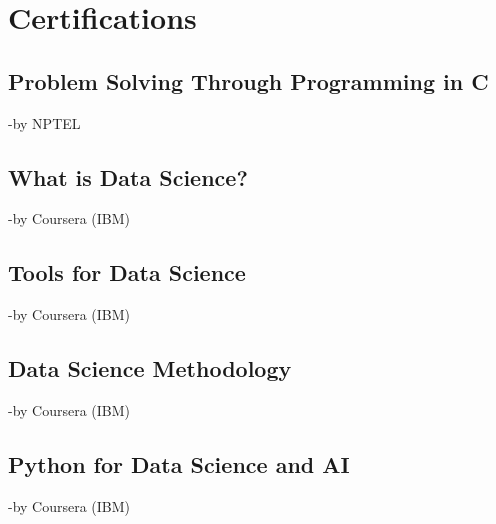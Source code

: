 \documentclass[]{deedy-resume-openfont}
\begin{document}
\begin{minipage}[t]{0.66\textwidth}
\section{Certifications} 
\sectionsep
\subsection{Problem Solving Through Programming in C}
-by NPTEL\\
\sectionsep

\sectionsep
\subsection{What is Data Science?}
-by Coursera (IBM)\\
\sectionsep

\sectionsep
\subsection{Tools for Data Science}
-by Coursera (IBM)\\
\sectionsep


\sectionsep
\subsection{Data Science Methodology}
-by Coursera (IBM)\\
\sectionsep

\sectionsep
\subsection{Python for Data Science and AI}
-by Coursera (IBM)\\
\sectionsep

\end{minipage} 
\end{document}
